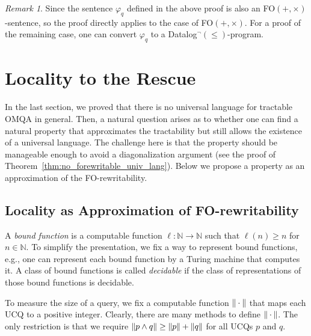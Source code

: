 \documentclass[letterpaper]{article} %
\theoremstyle{definition}
\theoremstyle{remark}
\newtheorem{rem}{Remark}
\theoremstyle{definition}
\begin{document}
\begin{rem}
Since the sentence $\varphi_q$ defined in the above proof is also an FO$(+,\times)$-sentence, so the proof directly applies to the case of FO$(+,\times)$. For a proof of the remaining case, one can convert $\varphi_q$ to a Datalog$^\neg(\le)$-program.
\end{rem}

\section{Locality to the Rescue}

In the last section, we proved that there is no universal language for tractable OMQA in general. Then, a natural question arises as to whether one can find a natural property that approximates the tractability but still allows the existence of a universal language. The challenge here is that the property should be manageable enough to avoid a diagonalization argument (see the proof of Theorem~\ref{thm:no_forewritable_univ_lang}). Below we propose a property as an approximation of the FO-rewritability. 

\subsection{Locality as Approximation of FO-rewritability}

A {\em bound function} is a computable function $\ell:\mathbb{N}\rightarrow\mathbb{N}$ such that $\ell(n)\ge n$ for $n\in\mathbb{N}$. To simplify the presentation, we fix a way to represent bound functions, e.g., one can represent each bound function by a Turing machine that computes it. A class of bound functions is called {\em decidable} if the class of representations of those bound functions is decidable.

To measure the size of a query, we fix a computable function $\dl\cdot\dl$ that maps each UCQ to a positive integer. Clearly, there are many methods to define $\dl\cdot\dl$. The only restriction is that we require $\dl p\wedge q\dl\ge\dl p\dl+\dl q\dl$ for all UCQs $p$ and $q$.
\end{document}
